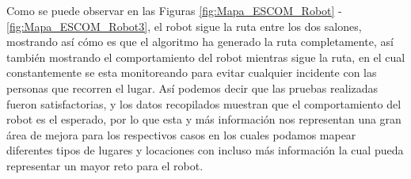     \vskip 0.5cm
    Como se puede observar en las Figuras \ref{fig:Mapa_ESCOM_Robot} - \ref{fig:Mapa_ESCOM_Robot3}, 
        el robot sigue la ruta entre los dos salones, mostrando as\'i
        c\'omo es que el algoritmo ha generado la ruta completamente, as\'i tambi\'en mostrando
        el comportamiento del robot mientras sigue la ruta, en el cual constantemente se esta
        monitoreando para evitar cualquier incidente con las personas que recorren el lugar.
    \vskip 0.5cm
    As\'i podemos decir que las pruebas realizadas fueron satisfactorias, y los datos
        recopilados muestran que el comportamiento del robot es el esperado, por lo que esta
        y m\'as informaci\'on nos representan una gran \'area de mejora para los respectivos casos
        en los cuales podamos mapear diferentes tipos de lugares y locaciones con incluso
        m\'as informaci\'on la cual pueda representar un mayor reto para el robot.